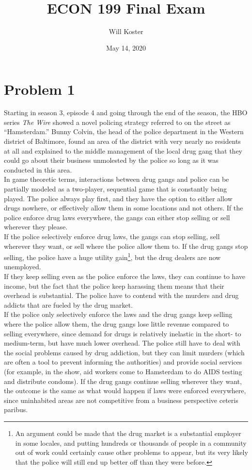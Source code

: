 \documentclass[letterpaper]{article}
\begin{document}
\title{ECON 199 Final Exam}
\author{Will Koster}
\date{May 14, 2020}
\maketitle

\clearpage

\section{Problem 1}
Starting in season 3, episode 4 and going through the end of the season, the HBO series \textit{The Wire} showed a novel policing strategy referred to on the street as ``Hamsterdam.'' Bunny Colvin, the head of the police department in the Western district of Baltimore, found an area of the district with very nearly no residents at all and explained to the middle management of the local drug gang that they could go about their business unmolested by the police so long as it was conducted in this area. \\
In game theoretic terms, interactions between drug gangs and police can be partially modeled as a two-player, sequential game that is constantly being played. The police always play first, and they have the option to either allow drugs nowhere, or effectively allow them in some locations and not others. If the police enforce drug laws everywhere, the gangs can either stop selling or sell wherever they please. \\
If the police selectively enforce drug laws, the gangs can stop selling, sell wherever they want, or sell where the police allow them to. If the drug gangs stop selling, the police have a huge utility gain\footnote{An argument could be made that the drug market is a substantial employer in some locales, and putting hundreds or thousands of people in a community out of work could certainly cause other problems to appear, but its very likely that the police will still end up better off than they were before.}, but the drug dealers are now unemployed. \\
If they keep selling even as the police enforce the laws, they can continue to have income, but the fact that the police keep harassing them means that their overhead is substantial. The police have to contend with the murders and drug addicts that are fueled by the drug market. \\
If the police only selectively enforce the laws and the drug gangs keep selling where the police allow them, the drug gangs lose little revenue compared to selling everywhere, since demand for drugs is relatively inelastic in the short- to medium-term, but have much lower overhead. The police still have to deal with the social problems caused by drug addiction, but they can limit murders (which are often a tool to prevent informing the authorities) and provide social services (for example, in the show, aid workers come to Hamsterdam to do AIDS testing and distribute condoms). If the drug gangs continue selling wherever they want, the outcome is the same as what would happen if laws were enforced everywhere, since uninhabited areas are not competitive from a business perspective ceteris paribus. \\
\end{document}
